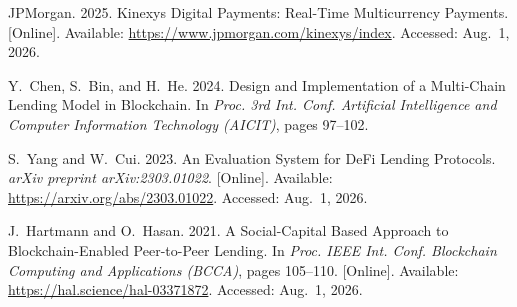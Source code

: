 \documentclass[12pt,a4paper]{report}
\begin{document}
{\begin{enumerate}[label={[\arabic*]}]
\item JPMorgan. 2025. Kinexys Digital Payments: Real-Time Multicurrency Payments. [Online]. Available: \url{https://www.jpmorgan.com/kinexys/index}. Accessed: Aug.~1, 2026.





\item Y.~Chen, S.~Bin, and H.~He. 2024. Design and Implementation of a Multi-Chain Lending Model in Blockchain. In \emph{Proc. 3rd Int. Conf. Artificial Intelligence and Computer Information Technology (AICIT)}, pages 97--102.

\item S.~Yang and W.~Cui. 2023. An Evaluation System for DeFi Lending Protocols. \emph{arXiv preprint arXiv:2303.01022}. [Online]. Available: \url{https://arxiv.org/abs/2303.01022}. Accessed: Aug.~1, 2026.

\item J.~Hartmann and O.~Hasan. 2021. A Social-Capital Based Approach to Blockchain-Enabled Peer-to-Peer Lending. In \emph{Proc. IEEE Int. Conf. Blockchain Computing and Applications (BCCA)}, pages 105--110. [Online]. Available: \url{https://hal.science/hal-03371872}. Accessed: Aug.~1, 2026.


\end{enumerate}}
\end{document}
